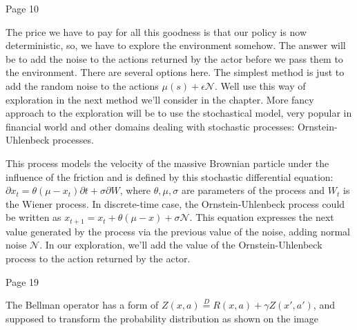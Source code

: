 Page 10

The price we have to pay for all this goodness is that our policy is now
deterministic, so, we have to explore the environment somehow. The answer will
be to add the noise to the actions returned by the actor before we pass them to
the environment. There are several options here. The simplest method is just to
add the random noise to the
actions \begin{math}\mu(s)+\epsilon\mathcal{N}\end{math}.
Well use this way of exploration in
the next method we’ll consider in the chapter. More fancy approach to the
exploration will be to use the stochastical model, very popular in financial
world and other domains dealing with stochastic processes: Ornstein-Uhlenbeck
processes.

This process models the velocity of the massive Brownian particle under the
influence of the friction and is defined by this stochastic differential
equation: \begin{math}\partial x_t=\theta(\mu-x_t)\partial t + \sigma\partial W\end{math},
where \begin{math}\theta, \mu, \sigma\end{math} are parameters of the process and \begin{math}W_t\end{math} is the
Wiener process. In discrete-time case, the Ornstein-Uhlenbeck process could be
written as \begin{math}x_{t+1}=x_t + \theta(\mu - x)+\sigma\mathcal{N} \end{math}.
This equation expresses the next value generated by
the process via the previous value of the noise, adding normal noise \begin{math}\mathcal{N}\end{math}.
In our exploration, we’ll add the value of the
Ornstein-Uhlenbeck process to the action returned by the actor.


Page 19

The Bellman operator has a form of
\begin{math}Z(x, a)\stackrel{D}{=} R(x, a) + \gamma Z(x', a')\end{math}, and supposed to transform the probability distribution as shown on the image



